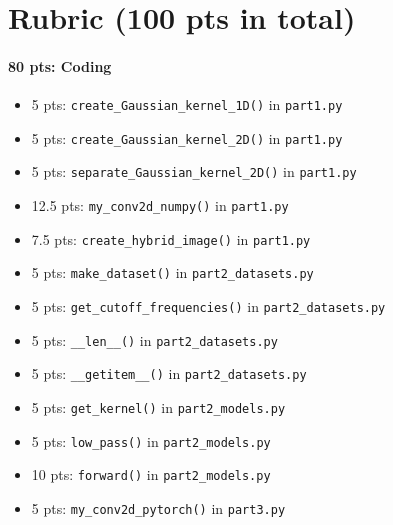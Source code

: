 \documentclass{article}
\begin{document}
\section*{Rubric (100 pts in total)}

\paragraph{80 pts: Coding}
\begin{itemize}
    \setlength\itemsep{-0.3em}
    \item 5 pts: \lstinline{create_Gaussian_kernel_1D()} in \lstinline{part1.py}
    \item 5 pts: \lstinline{create_Gaussian_kernel_2D()} in \lstinline{part1.py}
    \item 5 pts: \lstinline{separate_Gaussian_kernel_2D()} in \lstinline{part1.py}
    \item 12.5 pts: \lstinline{my_conv2d_numpy()} in \lstinline{part1.py}
    \item 7.5 pts: \lstinline{create_hybrid_image()} in \lstinline{part1.py}
    \item 5 pts: \lstinline{make_dataset()} in \lstinline{part2_datasets.py}
    \item 5 pts: \lstinline{get_cutoff_frequencies()} in \lstinline{part2_datasets.py}
    \item 5 pts: \lstinline{__len__()} in \lstinline{part2_datasets.py}
    \item 5 pts: \lstinline{__getitem__()} in \lstinline{part2_datasets.py}
    \item 5 pts: \lstinline{get_kernel()} in \lstinline{part2_models.py}
    \item 5 pts: \lstinline{low_pass()} in \lstinline{part2_models.py}
    \item 10 pts: \lstinline{forward()} in \lstinline{part2_models.py}
    \item 5 pts: \lstinline{my_conv2d_pytorch()} in \lstinline{part3.py}
\end{itemize}
\end{document}
